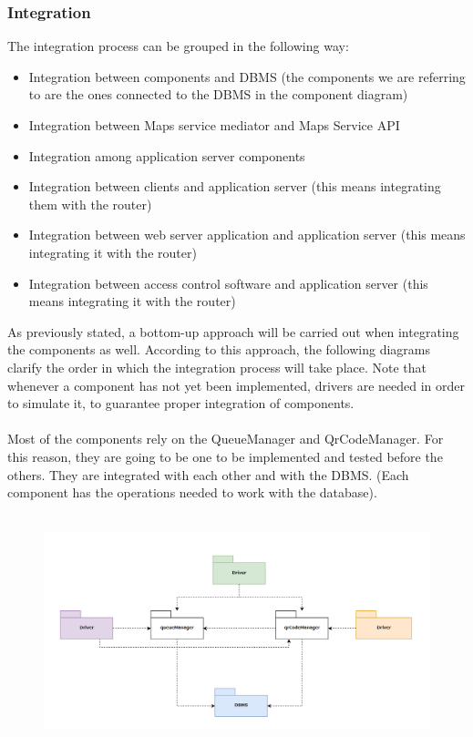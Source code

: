 \documentclass{article}
\begin{document}
\subsubsection{Integration}
The integration process can be grouped in the following way:
\begin{itemize}
\item Integration between components and DBMS (the components we are referring to are the ones connected to the DBMS in the component diagram)
\item Integration between Maps service mediator and Maps Service API
\item Integration among application server components
\item Integration between clients and application server (this means integrating them with the router)
\item Integration between web server application and application server (this means integrating it with the router)
\item Integration between access control software and application server (this means integrating it with the router)
\end{itemize}
As previously stated, a bottom-up approach will be carried out when integrating the components as well.  According to this approach, the following diagrams clarify the order in which the integration process will take place. 
Note that whenever a component has not yet been implemented, drivers are needed in order to simulate it, to guarantee proper integration of components.\\
\smallskip\\
Most of the components rely on the QueueManager and QrCodeManager. For this reason, they are going to be one to be implemented and tested before the others. They are integrated with each other and with the DBMS. (Each component has the operations needed to work with the database).\\
\smallskip\\
\begin{figure}[H]
  \includegraphics[width=\linewidth]{INTEGR1.png}
  
\end{figure}
\end{document}
